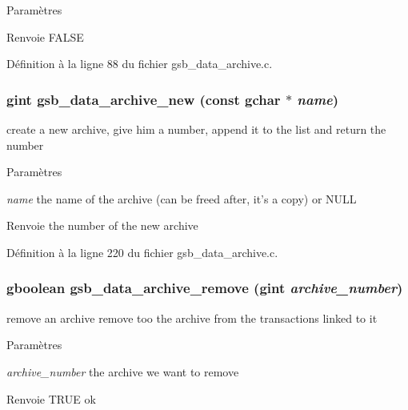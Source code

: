 \begin{DoxyParams}{Paramètres}
\item[{\em }]\end{DoxyParams}
\begin{DoxyReturn}{Renvoie}
FALSE 
\end{DoxyReturn}


Définition à la ligne 88 du fichier gsb\_\-data\_\-archive.c.

\subsubsection[{gsb\_\-data\_\-archive\_\-new}]{\setlength{\rightskip}{0pt plus 5cm}gint gsb\_\-data\_\-archive\_\-new (const gchar $\ast$ {\em name})}\label{gsb__data__archive_8c_af867698152bb736c36b4d02ec8a5b173}
create a new archive, give him a number, append it to the list and return the number


\begin{DoxyParams}{Paramètres}
\item[{\em name}]the name of the archive (can be freed after, it's a copy) or NULL\end{DoxyParams}
\begin{DoxyReturn}{Renvoie}
the number of the new archive 
\end{DoxyReturn}


Définition à la ligne 220 du fichier gsb\_\-data\_\-archive.c.

\subsubsection[{gsb\_\-data\_\-archive\_\-remove}]{\setlength{\rightskip}{0pt plus 5cm}gboolean gsb\_\-data\_\-archive\_\-remove (gint {\em archive\_\-number})}\label{gsb__data__archive_8c_a29c34a3d5e63dd56c7120e8ac464b204}
remove an archive remove too the archive from the transactions linked to it


\begin{DoxyParams}{Paramètres}
\item[{\em archive\_\-number}]the archive we want to remove\end{DoxyParams}
\begin{DoxyReturn}{Renvoie}
TRUE ok 
\end{DoxyReturn}


